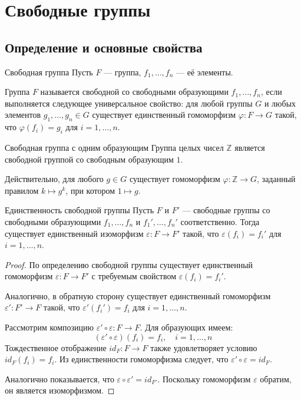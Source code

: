
\section{Свободные группы}

\subsection{Определение и основные свойства}

\begin{Definition}{Свободная группа}{}
	Пусть $F$ — группа, $f_1, \dots, f_n$ — её элементы. 
	
	Группа $F$ называется свободной со свободными образующими $f_1, \dots, f_n$, если выполняется следующее универсальное свойство: для любой группы $G$ и любых элементов $g_1, \dots, g_n \in G$ существует единственный гомоморфизм $\varphi: F \to G$ такой, что $\varphi(f_i) = g_i$ для $i = 1, \dots, n$.
\end{Definition}

\begin{Example}{Свободная группа с одним образующим}{}
	Группа целых чисел $\mathbb{Z}$ является свободной группой со свободным образующим $1$. 
	
	Действительно, для любого $g \in G$ существует гомоморфизм $\varphi: \mathbb{Z} \to G$, заданный правилом $k \mapsto g^k$, при котором $1 \mapsto g$.
\end{Example}

\begin{Proposition}{Единственность свободной группы}{}
	Пусть $F$ и $F'$ — свободные группы со свободными образующими $f_1, \dots, f_n$ и $f_1', \dots, f_n'$ соответственно. Тогда существует единственный изоморфизм $\varepsilon: F \to F'$ такой, что $\varepsilon(f_i) = f_i'$ для $i = 1, \dots, n$.
\end{Proposition}

\begin{proof}
	По определению свободной группы существует единственный гомоморфизм $\varepsilon: F \to F'$ с требуемым свойством $\varepsilon(f_i) = f_i'$. 
	
	Аналогично, в обратную сторону существует единственный гомоморфизм $\varepsilon': F' \to F$ такой, что $\varepsilon'(f_i') = f_i$ для $i = 1, \dots, n$.
	
	Рассмотрим композицию $\varepsilon' \circ \varepsilon: F \to F$. Для образующих имеем:
	\[ (\varepsilon' \circ \varepsilon)(f_i) = f_i, \quad i = 1, \dots, n \]
	Тождественное отображение $id_F: F \to F$ также удовлетворяет условию $id_F(f_i) = f_i$. Из единственности гомоморфизма следует, что $\varepsilon' \circ \varepsilon = id_F$.
	
	Аналогично показывается, что $\varepsilon \circ \varepsilon' = id_{F'}$. Поскольку гомоморфизм $\varepsilon$ обратим, он является изоморфизмом.
\end{proof}

